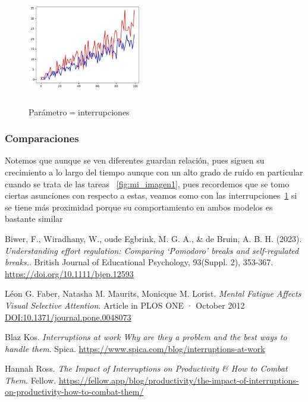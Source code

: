 \documentclass[10pt,a4paper,twocolumn]{article}
\begin{document}
\begin{figure}[H] %
    \centering 
    \includegraphics[width=5cm, height=5cm]{comparacion3.jpg} 
    \caption{Par\'ametro$ = $interrupciones} 
    \label{fig:mi_imagen3} 
\end{figure}

\subsubsection*{Comparaciones}
Notemos que aunque se ven diferentes guardan relaci\'on, pues siguen su crecimiento a lo largo del tiempo aunque con un alto grado de ruido en particular cuando se trata de las tareas ~\ref{fig:mi_imagen1}, pues recordemos que se tomo ciertas asunciones con respecto a estas, veamos como con las interrupciones~\ref{fig:mi_imagen3} si se tiene m\'as proximidad porque su comportamiento en ambos modelos es bastante similar 

\begin{thebibliography}{9} 
     Biwer, F., Wiradhany, W., oude Egbrink, M. G. A., \& de Bruin, A. B. H. 
    (2023).
    \textit{Understanding effort regulation: Comparing ‘Pomodoro’ breaks and self-regulated breaks.}. British Journal of Educational Psychology, 93(Suppl. 2), 353-367. \href{https://doi.org/10.1111/bjep.12593}{https://doi.org/10.1111/bjep.12593}


     L\'eon G. Faber, Natasha M. Maurits, Monicque M. Lorist. 
    \textit{Mental Fatigue Affects Visual Selective Attention}. Article  in  PLOS ONE · October 2012 
    \href{DOI:10.1371/journal.pone.0048073}{DOI:10.1371/journal.pone.0048073}

     Blaz Kos. 
    \textit{Interruptions at work Why are they a problem and the best ways to handle them}. 
    Spica.
    \href{https://www.spica.com/blog/interruptions-at-work}{https://www.spica.com/blog/interruptions-at-work}

     Hannah Ross. 
    \textit{The Impact of Interruptions on Productivity \& How to Combat Them}.
    Fellow.
    \href{https://fellow.app/blog/productivity/the-impact-of-interruptions-on-productivity-how-to-combat-them/}{https://fellow.app/blog/productivity/the-impact-of-interruptions-on-productivity-how-to-combat-them/}

\end{thebibliography}
\end{document}

